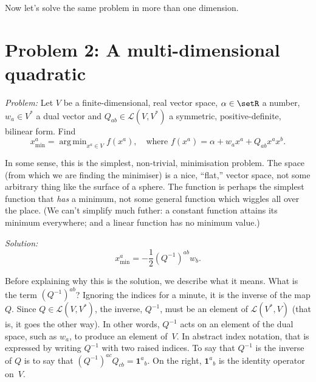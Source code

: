 \documentclass[10pt, a4paper]{article}
\newcommand{\id}{\mathbold{1}}
\DeclareMathOperator*{\argmin}{arg\,min}
\begin{document}
Now let's solve the same problem in more than one dimension.

\section{Problem 2: A multi-dimensional quadratic}

\emph{Problem:} Let $V$ be a finite-dimensional, real vector space,
$\alpha\in\setR$ a number, $w_a\in V^*$ a dual vector and
$Q_{ab} \in \mathcal{L}(V,V^*)$ a symmetric, positive-definite, bilinear
form. Find
\begin{equation*}
x^a_\text{min} = \argmin_{x^a\in V} f(x^a),\quad\text{where $f(x^a) = \alpha + w_ax^a + Q_{ab}x^ax^b$}.
\end{equation*}

In some sense, this is the simplest, non-trivial, minimisation
problem. The space (from which we are finding the minimiser) is a
nice, “flat,” vector space, not some arbitrary thing like the surface
of a sphere. The function is perhaps the simplest function that
\emph{has} a minimum, not some general function which wiggles all over
the place. (We can't simplify much futher: a constant function attains
its minimum everywhere; and a linear function has no minimum value.)

\emph{Solution:}
\begin{equation}
  x^a_\text{min} = -\frac{1}{2} {(Q^{-1})}^{ab}w_b.
\label{eq:sol-quadr-vect}
\end{equation}

Before explaining why this is the solution, we describe what it
means. What is the term ${(Q^{-1})}^{ab}$? Ignoring the indices for a
minute, it is the inverse of the map $Q$. Since
$Q\in\mathcal{L}(V, V^*)$, the inverse, $Q^{-1}$, must be an element of
$\mathcal{L}(V^*, V)$ (that is, it goes the other way). In other words,
$Q^{-1}$ acts on an element of the dual space, such as $w_a$, to
produce an element of~$V$. In abstract index notation, that is
expressed by writing $Q^{-1}$ with two raised indices. To say that
$Q^{-1}$ is the inverse of $Q$ is to say that
${(Q^{-1})}^{ac}Q_{cb} = \id^a{}_b$. On the right, $\id^a{}_b$ is the
identity operator on~$V$.
\end{document}
